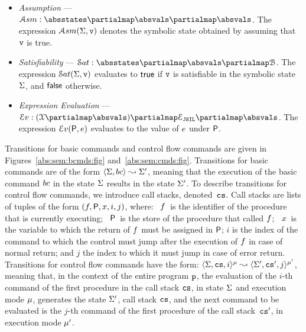 \begin{itemize}
   \item \emph{Assumption} --- $\absassume : \absstates \partialmap \absvals \partialmap \absvals$. 
            The expression $\mathcal{A}{sm}(\Sigma, \mathtt{v})$ denotes the symbolic state obtained by assuming that 
             $\mathtt{v}$ is true. 
  
   \item \emph{Satisfiability} --- $\abssat : \absstates \partialmap \absvals \partialmap \bools$. 
            The expression $\mathcal{S}at(\Sigma, \mathtt{v})$ evaluates to ${\sf true}$ if $\mathtt{v}$ is satisfiable in the symbolic 
            state $\Sigma$, and ${\sf false}$ otherwise. 
    
    \item \emph{Expression Evaluation} --- $\evalexpr :  (\jvars \partialmap \absvals)  \partialmap \exprs \partialmap \absvals$. 
            The expression $\mathcal{E}v({\sf P}, e)$ evaluates to the value of $e$ under ${\sf P}$. 
\end{itemize}

Transitions for basic commands and control flow commands are given 
in Figures~\ref{abs:sem:bcmds:fig} and~\ref{abs:sem:cmds:fig}. Transitions for 
basic commands are of the form 
$\langle \Sigma, bc \rangle \leadsto \Sigma'$, meaning that the execution of the basic command 
$bc$ in the state $\Sigma$ results in the state $\Sigma'$. 
%
To describe transitions for control flow commands, we introduce call stacks, denoted~$\mathtt{cs}$. 
Call stacks are lists of tuples of the form $(f, {\sf P}, x, i, j)$, where: 
~$f$~is the identifier of the procedure that is currently executing;
~${\sf P}$~is the store of the procedure that called $f$; 
~$x$~is the variable to which the return of $f$ must be assigned in ${\sf P}$; 
 $i$ is the index of the command to which the control must jump after the execution of $f$ in case of normal return; 
and  $j$ the index to which it must jump in case of error return. 
Transitions for control flow commands have the form:  $\langle \Sigma, \mathtt{cs}, i \rangle^{\mu} \leadsto \langle \Sigma', \mathtt{cs}', j \rangle^{\mu'}$, 
meaning that, in the context of the entire program $\mathtt{p}$, the evaluation of the $i$-th command of the first procedure in the 
call stack $\mathtt{cs}$, in state $\Sigma$ and execution mode $\mu$, generates 
the state $\Sigma'$, call stack $\mathtt{cs}$,  and the next command to be evaluated is the $j$-th command of the first procedure 
of the call stack~$\mathtt{cs}'$, in execution mode $\mu'$. 


